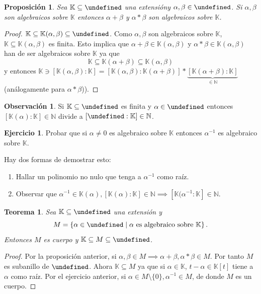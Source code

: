 \documentclass[10pt, spanish]{report}
\newtheorem*{prop}{Proposición}
\newtheorem*{tma}{Teorema}
\theoremstyle{definition}
\newtheorem*{ejer}{Ejercicio}
\newtheorem*{obs}{Observación}
\newcommand{\N}{\mathbb{N}}
\newcommand{\K}{\mathbb{K}}
\let\L\undefined
\newcommand{\L}{\mathbb{L}}
\begin{document}
\begin{prop}
    Sea $\K\subseteq\L$ una extensióny $\alpha,\beta\in\L$. Si $\alpha,\beta$
    son algebraicos sobre $\K$ entonces $\alpha+\beta$ y $\alpha*\beta$ son
    algebraicos sobre $\K$.
\end{prop}

\begin{proof}
    $\K\subseteq\K(\alpha,\beta)\subseteq\L$. Como $\alpha,\beta$ son
    algebraicos sobre $\K$, $\K\subseteq\K(\alpha,\beta)$ es finita. Esto
    implica que $\alpha+\beta\in\K(\alpha,\beta)$ y $\alpha*\beta\in
    \K(\alpha,\beta)$ han de ser algebraicos sobre $\K$ ya que
    \[\K\subseteq\K(\alpha+\beta)\subseteq\K(\alpha,\beta)\]
    y entonces $\K\ni[\K(\alpha,\beta):\K]=[\K(\alpha,\beta):\K(\alpha+\beta)]*
    \underbrace{[\K(\alpha+\beta):\K]}_{\in \N}$ (análogamente para
    $\alpha*\beta$)).
\end{proof}

\begin{obs}
    Si $\K\subseteq\L$ es finita y $\alpha\in\L$ entonces $[\K(\alpha):\K]\in
    \N$ divide a $[\L:\K]\in\N$.
\end{obs}

\begin{ejer}
    Probar que si $\alpha\neq 0$ es algebraico sobre $\K$ entonces $\alpha^{-1}$
    es algebraico sobre $\K$.
\end{ejer}

Hay dos formas de demostrar esto:
\begin{enumerate}
    \item Hallar un polinomio no nulo que tenga a $\alpha^{-1}$ como raíz.
    \item Observar que $\alpha^{-1}\in \K(\alpha),[\K(\alpha):\K]\in\N\implies
        [\K(\alpha^{-1}:\K]\in\N$.
\end{enumerate}

\begin{tma}
    Sea $\K\subseteq\L$ una extensión y \[M=\left\{ \alpha\in\L\mid\alpha\text{ es
    algebraico sobre }\K \right\}.\]
    Entonces $M$ es cuerpo y $\K\subseteq M\subseteq\L$.
\end{tma}

\begin{proof}
    Por la proposición anterior, si $\alpha,\beta\in
    M\implies\alpha+\beta,\alpha*\beta\in M$. Por tanto $M$ es subanillo de
    $\L$. Ahora $\K\subseteq M$ ya que si $\alpha\in\K$, $t-\alpha\in\K[t]$
    tiene a $\alpha$ como raíz. Por el ejercicio anterior, si $\alpha\in
    M\setminus\{0\}, \alpha^{-1}\in M$, de donde $M$ es un cuerpo.
\end{proof}
\end{document}
